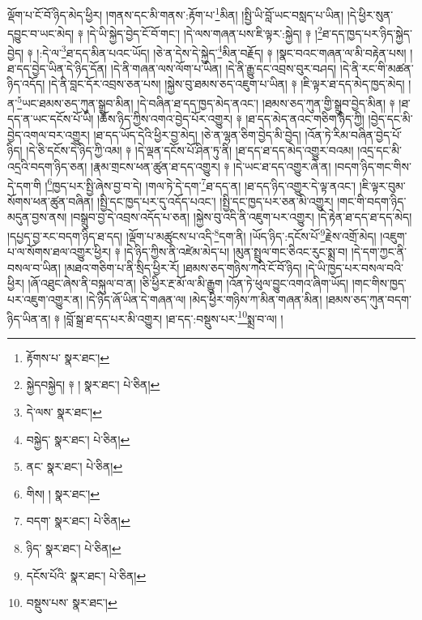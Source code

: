 ལྡོག་པ་ངོ་བོ་ཉིད་མེད་ཕྱིར། །གནས་དང་མི་གནས་:རྟོག་པ་\footnote{རྟོགས་པ་  སྣར་ཐང་། }མིན། །སྤྱི་ཡི་བློ་ཡང་བསླད་པ་ཡིན། །དེ་ཕྱིར་སུན་དབྱུང་བ་ཡང་མེད། ༈ །དེ་ཡི་སྐྱེད་བྱེད་ངོ་བོ་གང་། །དེ་ལས་གཞན་པས་ཇི་ལྟར་:སྐྱེད། ༈ །\footnote{སྐྱེདབསྐྱེད། ༈ །  སྣར་ཐང་།  པེ་ཅིན། }ཐ་དད་ཁྱད་པར་ཉིད་སྐྱེད་བྱེད། ༈ །:དེ་ལ་\footnote{དེ་ལས་  སྣར་ཐང་། }ཐ་དད་མིན་པའང་ཡོད། །ཅེ་ན་དེས་དེ་སྐྱེད་\footnote{བསྐྱེད་  སྣར་ཐང་།  པེ་ཅིན། }མིན་བརྗོད། ༈ །སྣང་བའང་གཞན་ལ་མི་བརྟེན་པས། །ཐ་དད་བྱེད་ཡིན་དེ་ཉིད་དོན། །དེ་ནི་གཞན་ལས་ལོག་པ་ཡིན། །དེ་ནི་རྒྱུ་དང་འབྲས་བུར་བཤད། །དེ་ནི་རང་གི་མཚན་ཉིད་འདོད། །དེ་ནི་བླང་དོར་འབྲས་ཅན་པས། །སྐྱེས་བུ་ཐམས་ཅད་འཇུག་པ་ཡིན། ༈ །ཇི་ལྟར་ཐ་དད་མེད་ཁྱད་མེད། །ན་\footnote{ནང་  སྣར་ཐང་།  པེ་ཅིན། }ཡང་ཐམས་ཅད་ཀུན་སྒྲུབ་མིན། །དེ་བཞིན་ཐ་དད་ཁྱད་མེད་ནའང་། །ཐམས་ཅད་ཀུན་གྱི་སྒྲུབ་བྱེད་མིན། ༈ །ཐ་དད་ན་ཡང་དངོས་པོ་ཡི། །ཆོས་ཉིད་ཀྱིས་འགའ་བྱེད་པོར་འགྱུར། ༈ །ཐ་དད་མེད་ནའང་གཅིག་ཉིད་ཀྱི། །བྱེད་དང་མི་བྱེད་འགལ་བར་འགྱུར། །ཐ་དད་ཡོད་དེའི་ཕྱིར་བྱ་མེད། །ཅེ་ན་ལྷན་ཅིག་བྱེད་མི་བྱེད། །འོན་ཏེ་རིམ་བཞིན་བྱེད་པོ་ཉིད། །དེ་ཅི་དངོས་དེ་ཉིད་ཀྱི་འམ། ༈ །དེ་ལྡན་དངོས་པོ་ཤིན་ཏུ་ནི། །ཐ་དད་ཐ་དད་མེད་འགྱུར་བའམ། །འདྲ་དང་མི་འདྲའི་བདག་ཉིད་ཅན། །རྣམ་གྲངས་ཕན་ཚུན་ཐ་དད་འགྱུར། ༈ །དེ་ཡང་ཐ་དད་འགྱུར་ཞེ་ན། །བདག་ཉིད་གང་གིས་དེ་དག་གི །\footnote{གིས། །  སྣར་ཐང་། }ཁྱད་པར་སྤྱི་ཞེས་བྱ་བ་དེ། །གལ་ཏེ་དེ་དག་\footnote{བདག་  སྣར་ཐང་།  པེ་ཅིན། }ཐ་དད་ན། །ཐ་དད་ཉིད་འགྱུར་དེ་ལྟ་ནའང་། །ཇི་ལྟར་བུམ་སོགས་ཕན་ཚུན་བཞིན། །སྤྱི་དང་ཁྱད་པར་དུ་འདོད་པའང་། །སྤྱི་དང་ཁྱད་པར་ཅན་མི་འགྱུར། །གང་གི་བདག་ཉིད་མདུན་བྱས་ནས། །བསྒྲུབ་བྱ་དེ་འབྲས་འདོད་པ་ཅན། །སྐྱེས་བུ་འདི་ནི་འཇུག་པར་འགྱུར། །དེ་རྟེན་ཐ་དད་ཐ་དད་མེད། །དཔྱད་བྱ་རང་བདག་ཉིད་ཐ་དད། །ལྡོག་པ་མཚུངས་པ་འདི་\footnote{ཉིད་  སྣར་ཐང་།  པེ་ཅིན། }དག་ནི། །ཡོད་ཉིད་:དངོས་པོ་\footnote{དངོས་པོའི་  སྣར་ཐང་།  པེ་ཅིན། }རྗེས་འགྲོ་མེད། །འཇུག་པ་ལ་སོགས་ཐལ་འགྱུར་ཕྱིར། ༈ །དེ་ཉིད་ཀྱིས་ནི་འཛེམ་མེད་པ། །མུན་སྤྲུལ་གང་ཅིའང་རུང་སྨྲ་བ། །དེ་དག་ཀྱང་ནི་བསལ་བ་ཡིན། །མཐའ་གཅིག་པ་ནི་སྲིད་ཕྱིར་རོ། །ཐམས་ཅད་གཉིས་ཀའི་ངོ་བོ་ཉིད། །དེ་ཡི་ཁྱད་པར་བསལ་བའི་ཕྱིར། །ཞོ་འཐུང་ཞེས་ནི་བསྐུལ་བ་ན། །ཅི་ཕྱིར་རྔ་མོ་ལ་མི་རྒྱུག །འོན་ཏེ་ཕུལ་བྱུང་འགའ་ཞིག་ཡོད། །གང་གིས་ཁྱད་པར་འཇུག་འགྱུར་ན། །དེ་ཉིད་ཞོ་ཡིན་དེ་གཞན་ལ། །མེད་ཕྱིར་གཉིས་ཀ་མིན་གཞན་མིན། །ཐམས་ཅད་ཀུན་བདག་ཉིད་ཡིན་ན། ༈ །བློ་སྒྲ་ཐ་དད་པར་མི་འགྱུར། །ཐ་དད་:བསྡུས་པར་\footnote{བསྡུས་པས་  སྣར་ཐང་། }སྨྲ་བ་ལ། །
